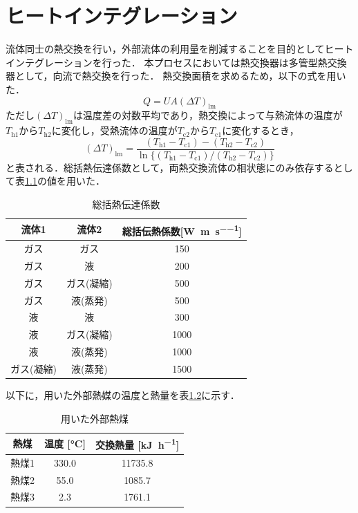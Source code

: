 \documentclass[a4j]{jsreport}
\begin{document}
\clearpage
\chapter{ヒートインテグレーション}
流体同士の熱交換を行い，外部流体の利用量を削減することを目的としてヒートインテグレーションを行った．
本プロセスにおいては熱交換器は多管型熱交換器として，向流で熱交換を行った．
熱交換面積を求めるため，以下の式を用いた．
\begin{equation}
    Q=UA(\varDelta T)_\mathrm{lm}
\end{equation}
ただし$(\varDelta T)_\mathrm{lm}$は温度差の対数平均であり，熱交換によって与熱流体の温度が$T_\mathrm{h1}$から$T_\mathrm{h2}$に変化し，受熱流体の温度が$T_\mathrm{c2}$から$T_\mathrm{c1}$に変化するとき，
\begin{equation}
    (\varDelta T)_\mathrm{lm} = \frac{(T_\mathrm{h1} - T_\mathrm{c1}) - (T_\mathrm{h2} - T_\mathrm{c2})}{\ln\{(T_\mathrm{h1} - T_\mathrm{c1}) / (T_\mathrm{h2} - T_\mathrm{c2})\}}
\end{equation}
と表される．総括熱伝達係数として，両熱交換流体の相状態にのみ依存するとして表\ref{総括熱伝達係数}の値を用いた．
\begin{table}[htbp]
  \centering
  \caption{総括熱伝達係数}
  \label{総括熱伝達係数}
  \begin{tabular}{ccc}
    \hline
    流体1 & 流体2 & 総括伝熱係数[\si{\watt \per \metre \per \second}] \\
    \hline
    ガス & ガス &150 \\
    ガス & 液 &200 \\
    ガス & ガス(凝縮) & 500 \\
    ガス & 液(蒸発) & 500 \\
    液 & 液 & 300 \\
    液 & ガス(凝縮) & 1000 \\
    液 & 液(蒸発) & 1000 \\
    ガス(凝縮) & 液(蒸発) &1500 \\
    \hline
  \end{tabular}
\end{table}

以下に，用いた外部熱媒の温度と熱量を表\ref{用いた外部熱煤}に示す．
\begin{table}
  \centering
  \caption{用いた外部熱煤}
  \label{用いた外部熱煤}
  \begin{tabular}{ccc}
    \hline
    熱煤 & 温度 [\si{\degreeCelsius}] & 交換熱量 [\si{\kilo \joule \per \hour}] \\
    \hline
    熱煤1 & 330.0 & 11735.8 \\
    熱煤2 & 55.0 & 1085.7 \\
    熱煤3 & 2.3 & 1761.1 \\
    \hline
  \end{tabular}
\end{table}
\end{document}
